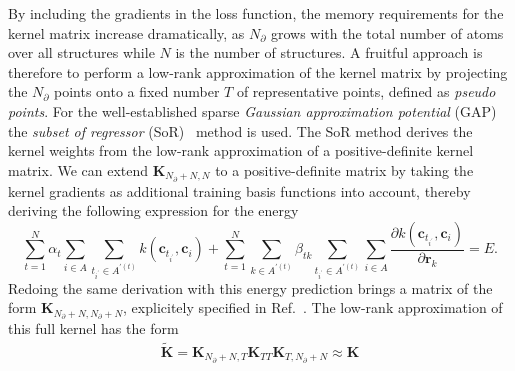By including the gradients in the loss function, the memory requirements for the kernel matrix increase dramatically, as $N_{\partial}$ grows with the total number of atoms over all structures while $N$ is the number of structures.
%
A fruitful approach is therefore to perform a low-rank approximation of the kernel matrix by projecting the $N_{\partial}$ points onto a fixed number $T$ of representative points, defined as \emph{pseudo points}.
For the well-established sparse \emph{Gaussian approximation potential} (GAP)~\cite{bart+10prl} the \emph{subset of regressor} (SoR)~\cite{wahba1998bias,smola2000sparse,quinonero2005unifying} method is used.
The SoR method derives the kernel weights from the low-rank approximation of a positive-definite kernel matrix.
We can extend $\mathbf{K}_{N_{\partial}+N,N}$ to a positive-definite matrix by taking the kernel gradients as additional training basis functions into account, thereby deriving the following expression for the energy
\begin{equation}
  \sum_{t=1}^N \alpha_t \sum_{i\in A} \sum_{t_{i^\prime}\in A^{\prime(t)}} k(\mathbf{c}_{t_{i^\prime}}, \mathbf{c}_{i}) + \sum_{t=1}^{N}\sum_{k\in A^{\prime(t)}}\beta_{tk} \sum_{t_{i^\prime}\in A^{\prime(t)}}\sum_{i\in A} \frac{\partial k(\mathbf{c}_{t_{i^\prime}}, \mathbf{c}_{i})}{\partial\mathbf{r}_k} = E.
\end{equation}
Redoing the same derivation with this energy prediction brings a matrix of the form $\mathbf{K}_{N_{\partial}+N,N_{\partial}+N}$, explicitely specified in Ref.~\cite{bartok2015gaptutorial}.
The low-rank approximation of this full kernel has the form
\begin{subequations}
\begin{align}
  \tilde{\mathbf{K}} = \mathbf{K}^{\phantom{1}}_{N_{\partial}+N,T}\mathbf{K}^{\phantom{1}}_{TT}\mathbf{K}_{T,N_{\partial}+N} \approx \mathbf{K}%
\end{align}
\end{subequations}
